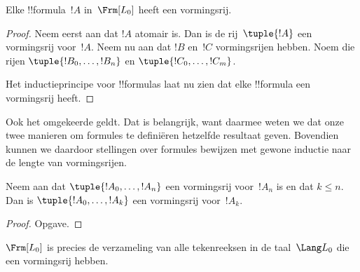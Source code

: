 \documentclass[openany]{memoir}
\begin{document}
\begin{prop}
Elke !!{formula}~$!A$ in~$\Frm[L_0]$ heeft een vormingsrij.
\end{prop}

\begin{proof}
Neem eerst aan dat $!A$ atomair is. Dan is de rij~$\tuple{!A}$ een
vormingsrij voor~$!A$.
%
Neem nu aan dat $!B$ en~$!C$ vormingsrijen hebben. Noem die rijen
$\tuple{!B_0,\dotsc,!B_n}$ en $\tuple{!C_0,\dotsc,!C_m}$.
%
\begin{enumerate}
\end{enumerate}
Het inductieprincipe voor !!{formula}s laat nu zien dat elke
!!{formula} een vormingsrij heeft.
\end{proof}

Ook het omgekeerde geldt. Dat is belangrijk, want daarmee weten we dat
onze twee manieren om formules te definiëren hetzelfde resultaat
geven. Bovendien kunnen we daardoor stellingen over formules bewijzen
met gewone inductie naar de lengte van vormingsrijen.

\begin{lem}
Neem aan dat $\tuple{!A_0,\dotsc,!A_n}$ een vormingsrij voor~$!A_n$ is
en dat $k \leq n$. Dan is $\tuple{!A_0,\dotsc,!A_k}$ een vormingsrij
voor~$!A_k$.
\end{lem}

\begin{proof}
Opgave.
\end{proof}

\begin{thm}
$\Frm[L_0]$ is precies de verzameling van alle tekenreeksen in de
taal~$\Lang L_0$ die een vormingsrij hebben.
\end{thm}
\end{document}
